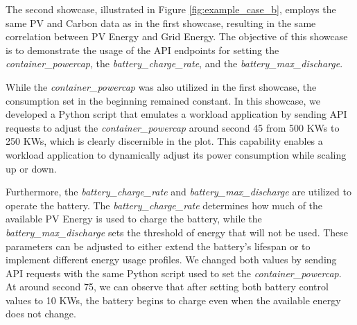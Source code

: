 The second showcase, illustrated in Figure \ref{fig:example_case_b}, employs the same PV and Carbon data as in the first showcase, resulting in the same correlation between PV Energy and Grid Energy. The objective of this showcase is to demonstrate the usage of the API endpoints for setting the \textit{container\_powercap}, the \textit{battery\_charge\_rate}, and the \textit{battery\_max\_discharge}.

While the \textit{container\_powercap} was also utilized in the first showcase, the consumption set in the beginning remained constant. In this showcase, we developed a Python script that emulates a workload application by sending API requests to adjust the \textit{container\_powercap} around second 45 from 500 KWs to 250 KWs, which is clearly discernible in the plot. This capability enables a workload application to dynamically adjust its power consumption while scaling up or down.

Furthermore, the \textit{battery\_charge\_rate} and \textit{battery\_max\_discharge} are utilized to operate the battery. The \textit{battery\_charge\_rate} determines how much of the available PV Energy is used to charge the battery, while the \textit{battery\_max\_discharge} sets the threshold of energy that will not be used. These parameters can be adjusted to either extend the battery's lifespan or to implement different energy usage profiles. We changed both values by sending API requests with the same Python script used to set the \textit{container\_powercap}. At around second 75, we can observe that after setting both battery control values to 10 KWs, the battery begins to charge even when the available energy does not change.